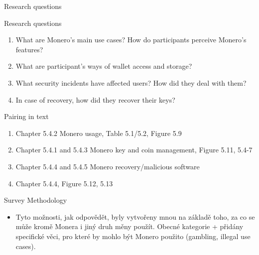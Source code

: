 \documentclass{beamer}
\begin{document}
\begin{darkframes}
    \begin{frame}{Research questions}
       \begin{multicols}{2}
       Research questions
      \begin{small}
      \begin{enumerate}
      \item What are Monero’s main use cases? How do participants
perceive Monero’s features?
      \item What are participant’s ways of wallet access and storage?
      \item What security incidents have affected users? How did they
deal with them?
      \item In case of recovery, how did they recover their keys?
      \end{enumerate}
      Pairing in text
      \begin{enumerate}
            \item Chapter 5.4.2 Monero usage, Table 5.1/5.2, Figure 5.9
      \item Chapter 5.4.1 and 5.4.3 Monero key and coin management, Figure 5.11, 5.4-7 
      \item Chapter 5.4.4 and 5.4.5 Monero recovery/malicious software
      \item Chapter 5.4.4, Figure 5.12, 5.13
      \end{enumerate}
      \end{small}
      \end{multicols}
    \end{frame}
    
        \begin{frame}{Survey Methodology}
\begin{itemize}
\item Tyto možnosti, jak odpovědět, byly vytvořeny mnou na základě toho, za co se může kromě Monera i jiný druh měny použít. Obecné kategorie + přidány specifické věci, pro které by mohlo být Monero použito (gambling, illegal use cases).
\end{itemize}
\end{frame}


\end{darkframes}
\end{document}
